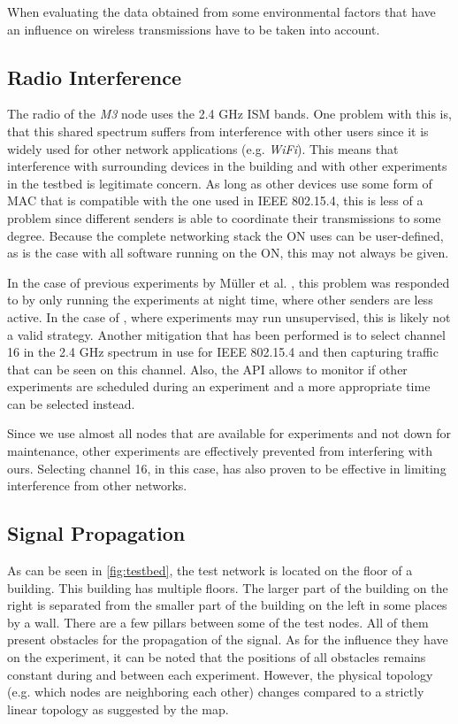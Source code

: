 When evaluating the data obtained from \fitlab some environmental factors that
have an influence on wireless transmissions have to be taken into account.

\subsection{Radio Interference}

The radio of the \emph{M3} node uses the 2.4 GHz \ac{ISM} bands. One problem
with this is, that this shared spectrum suffers from interference with other
users since it is widely used for other network applications (e.g. \emph{WiFi}).
This means that interference with surrounding devices in the building and with
other experiments in the testbed is legitimate concern. As long as other devices
use some form of \ac{MAC} that is compatible with the one used in IEEE 802.15.4,
this is less of a problem since different senders is able to
coordinate their transmissions to some degree. Because the complete networking
stack the \ac{ON} uses can be user-defined, as is the case with all software
running on the \ac{ON}, this may not always be given.

In the case of previous experiments by Müller et al. \cite{mueller2017}, this
problem was responded to by only running the experiments at night time, where
other senders are less active. In the case of \fitlab, where experiments
may run unsupervised, this is likely not a valid strategy. Another mitigation that
has been performed is to select channel 16 in the 2.4 GHz spectrum in use for
IEEE 802.15.4 and then capturing traffic that can be seen on this channel. Also,
the \ac{API} allows to monitor if other experiments are scheduled during an
experiment and a more appropriate time can be selected instead.

Since we use almost all nodes that are available for experiments and not down
for maintenance, other experiments are effectively prevented from interfering
with ours. Selecting channel 16, in this case, has also proven to be effective in limiting
interference from other networks.

\subsection{Signal Propagation}

As can be seen in \autoref{fig:testbed}, the test network is located on the floor
of a building. This building has multiple floors. The larger part of the
building on the right is separated from the smaller part of the building on the
left in some places by a wall. There are a few pillars between some of the test
nodes. All of them present obstacles for the propagation of the signal. As for the influence
they have on the experiment, it can be noted that the positions of all obstacles
remains constant during and between each experiment. However, the physical topology
(e.g. which nodes are neighboring each other) changes compared to a strictly
linear topology as suggested by the map.

